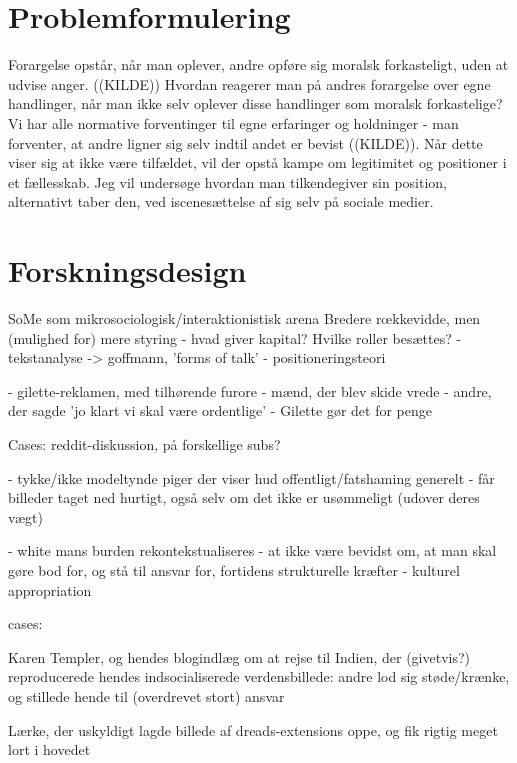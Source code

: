 \section{Problemformulering}

Forargelse opstår, når man oplever, andre opføre sig moralsk forkasteligt,
uden at udvise anger. ((KILDE)) Hvordan reagerer man på andres forargelse
over egne handlinger, når man ikke selv oplever disse handlinger som
moralsk forkastelige? Vi har alle normative forventinger til egne
erfaringer og holdninger - man forventer, at andre ligner sig selv indtil
andet er bevist ((KILDE)). Når dette viser sig at ikke være tilfældet, vil
der opstå kampe om legitimitet og positioner i et fællesskab. Jeg vil
undersøge hvordan man tilkendegiver sin position, alternativt taber den,
ved iscenesættelse af sig selv på sociale medier.


\section{Forskningsdesign}

SoMe som mikrosociologisk/interaktionistisk arena
Bredere rœkkevidde, men (mulighed for) mere styring
    - hvad giver kapital? Hvilke roller besættes?
    - tekstanalyse -> goffmann, 'forms of talk'
    - positioneringsteori


- gilette-reklamen, med tilhørende furore
    - mænd, der blev skide vrede
    - andre, der sagde 'jo klart vi skal være ordentlige'
    - Gilette gør det for penge

    Cases: reddit-diskussion, på forskellige subs?


- tykke/ikke modeltynde piger der viser hud offentligt/fatshaming generelt
    - får billeder taget ned hurtigt, også selv om det ikke er usømmeligt
    (udover deres vægt)

- white mans burden rekontekstualiseres
    - at ikke være bevidst om, at man skal gøre bod for, og stå til ansvar
    for, fortidens strukturelle kræfter
    - kulturel appropriation
    
    cases:
    
    Karen Templer, og hendes blogindlæg om at rejse til Indien, der
    (givetvis?) reproducerede hendes indsocialiserede verdensbillede:
    andre lod sig støde/krænke, og stillede hende til (overdrevet stort)
    ansvar

    Lærke, der uskyldigt lagde billede af dreads-extensions oppe, og fik
    rigtig meget lort i hovedet


